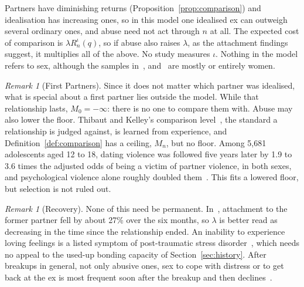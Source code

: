 \documentclass[11pt]{article}
\theoremstyle{definition}
\theoremstyle{remark}
\newtheorem{remark}[theorem]{Remark}
\begin{document}
Partners have diminishing returns (Proposition~\ref{prop:comparison})
and idealisation has increasing ones, so in this model one idealised ex
can outweigh several ordinary ones, and abuse need not act through $n$
at all. The expected cost of comparison is $\lambda R_n^\iota(q)$, so if
abuse also raises $\lambda$, as the attachment findings suggest, it
multiplies all of the above. No study measures $\iota$. Nothing in the
model refers to sex, although the samples in~\cite{day}, \cite{dutton}
and~\cite{arabi} are mostly or entirely women.

\begin{remark}[First Partners]
  Since it does not matter which partner was idealised, what is special
  about a first partner lies outside the model. While that relationship
  lasts, $M_0 = -\infty$: there is no one to compare them with. Abuse may
  also lower the floor. Thibaut and Kelley's comparison
  level~\cite{thibaut}, the standard a relationship is judged against, is
  learned from experience, and Definition~\ref{def:comparison} has a
  ceiling, $M_n$, but no floor. Among 5,681 adolescents aged 12 to 18,
  dating violence was followed five years later by 1.9 to 3.6 times the
  adjusted odds of being a victim of partner violence, in both sexes, and
  psychological violence alone roughly doubled them~\cite{exner}. This
  fits a lowered floor, but selection is not ruled out.
\end{remark}

\begin{remark}[Recovery]
  None of this need be permanent. In~\cite{dutton}, attachment to the
  former partner fell by about 27\% over the six months, so $\lambda$ is
  better read as decreasing in the time since the relationship ended. An
  inability to experience loving feelings is a listed symptom of
  post-traumatic stress disorder~\cite{dsm}, which needs no appeal to the
  used-up bonding capacity of Section~\ref{sec:history}. After breakups in
  general, not only abusive ones, sex to cope with distress or to get back
  at the ex is most frequent soon after the breakup and then
  declines~\cite{barber}.
\end{remark}
\end{document}
